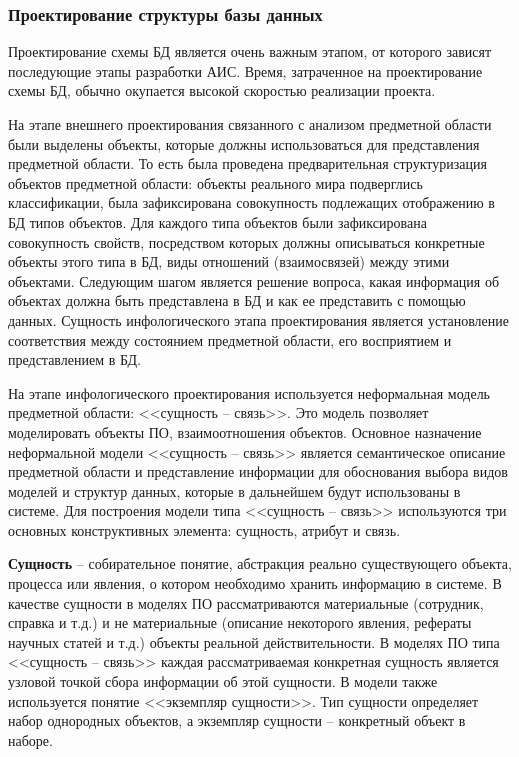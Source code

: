 \subsubsection{Проектирование структуры базы данных} \hfill

Проектирование схемы БД является очень важным этапом, от которого зависят последующие этапы разработки АИС. Время, затраченное на проектирование схемы БД, обычно окупается высокой скоростью реализации проекта.

На этапе внешнего проектирования связанного с анализом предметной области были выделены объекты, которые должны использоваться для представления предметной области. То есть была проведена предварительная структуризация объектов предметной области: объекты реального мира подверглись классификации, была зафиксирована совокупность подлежащих отображению в БД типов объектов. Для каждого типа объектов были зафиксирована совокупность свойств, посредством которых должны описываться конкретные объекты этого типа в БД, виды отношений (взаимосвязей) между этими объектами. Следующим шагом является решение вопроса, какая информация об объектах должна быть представлена в БД и как ее представить с помощью данных. Сущность инфологического этапа проектирования является установление соответствия между состоянием предметной области, его восприятием и представлением в БД.

На этапе инфологического проектирования используется неформальная модель предметной области: <<сущность -- связь>>. Это модель позволяет моделировать объекты ПО, взаимоотношения объектов. Основное назначение неформальной модели <<сущность -- связь>> является семантическое описание предметной области и представление информации для обоснования выбора видов моделей и структур данных, которые в дальнейшем будут использованы в системе. Для построения модели типа <<сущность -- связь>> используются три основных конструктивных элемента: сущность, атрибут и связь.

\textbf{Сущность} -- собирательное понятие, абстракция реально существующего объекта, процесса или явления, о котором необходимо хранить информацию в системе. В качестве сущности в моделях ПО рассматриваются материальные (сотрудник, справка и т.д.) и не материальные (описание некоторого явления, рефераты научных статей и т.д.) объекты реальной действительности. В моделях ПО типа <<сущность -- связь>> каждая рассматриваемая конкретная сущность является узловой точкой сбора информации об этой сущности. В модели также используется понятие <<экземпляр сущности>>. Тип сущности определяет набор однородных объектов, а экземпляр сущности -- конкретный объект в наборе.


